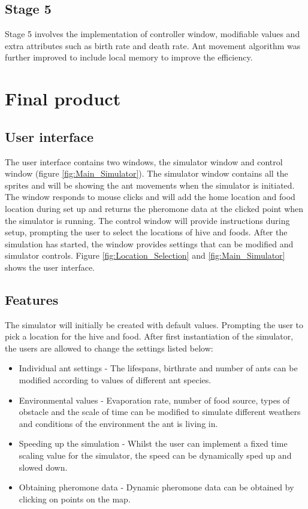 \documentclass[a4paper, oneside, 11pt]{report}
\begin{document}
\subsection{Stage 5}
Stage 5 involves the implementation of controller window, modifiable values and extra attributes such as birth rate and death rate. Ant movement algorithm was further improved to include local memory to improve the efficiency.

\section{Final product}
\subsection{User interface}
The user interface contains two windows, the simulator window and control window (figure \ref{fig:Main_Simulator}). The simulator window contains all the sprites and will be showing the ant movements when the simulator is initiated. The window responds to mouse clicks and will add the home location and food location during set up and returns the pheromone data at the clicked point when the simulator is running. The control window will provide instructions during setup, prompting the user to select the locations of hive and foods. After the simulation has started, the window provides settings that can be modified and simulator controls. Figure \ref{fig:Location_Selection} and \ref{fig:Main_Simulator} shows the user interface.

\subsection{Features}
The simulator will initially be created with default values. Prompting the user to pick a location for the hive and food. After first instantiation of the simulator, the users are allowed to change the settings listed below:
\begin{itemize}
	\item Individual ant settings - The lifespans, birthrate and number of ants can be modified according to values of different ant species.
	\item Environmental values - Evaporation rate, number of food source, types of obstacle and the scale of time can be modified to simulate different weathers and conditions of the environment the ant is living in.
	\item Speeding up the simulation - Whilst the user can implement a fixed time scaling value for the simulator, the speed can be dynamically sped up and slowed down.
	\item Obtaining pheromone data - Dynamic pheromone data can be obtained by clicking on points on the map.
\end{itemize}
\end{document}
